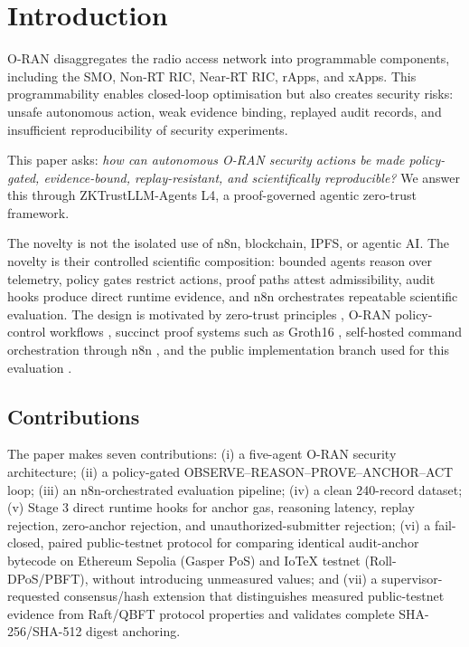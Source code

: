 \section{Introduction}
O-RAN disaggregates the radio access network into programmable components, including the SMO, Non-RT RIC, Near-RT RIC, rApps, and xApps. This programmability enables closed-loop optimisation but also creates security risks: unsafe autonomous action, weak evidence binding, replayed audit records, and insufficient reproducibility of security experiments.

This paper asks: \emph{how can autonomous O-RAN security actions be made policy-gated, evidence-bound, replay-resistant, and scientifically reproducible?} We answer this through ZKTrustLLM-Agents L4, a proof-governed agentic zero-trust framework.

The novelty is not the isolated use of n8n, blockchain, IPFS, or agentic AI. The novelty is their controlled scientific composition: bounded agents reason over telemetry, policy gates restrict actions, proof paths attest admissibility, audit hooks produce direct runtime evidence, and n8n orchestrates repeatable scientific evaluation. The design is motivated by zero-trust principles \cite{nist207}, O-RAN policy-control workflows \cite{oranA1}, succinct proof systems such as Groth16 \cite{groth16}, self-hosted command orchestration through n8n \cite{n8nExecute}, and the public implementation branch used for this evaluation \cite{zktrustrepo}.

\subsection{Contributions}
The paper makes seven contributions: (i) a five-agent O-RAN security architecture; (ii) a policy-gated OBSERVE--REASON--PROVE--ANCHOR--ACT loop; (iii) an n8n-orchestrated evaluation pipeline; (iv) a clean 240-record dataset; (v) Stage 3 direct runtime hooks for anchor gas, reasoning latency, replay rejection, zero-anchor rejection, and unauthorized-submitter rejection; (vi) a fail-closed, paired public-testnet protocol for comparing identical audit-anchor bytecode on Ethereum Sepolia (Gasper PoS) and IoTeX testnet (Roll-DPoS/PBFT), without introducing unmeasured values; and (vii) a supervisor-requested consensus/hash extension that distinguishes measured public-testnet evidence from Raft/QBFT protocol properties and validates complete SHA-256/SHA-512 digest anchoring.

